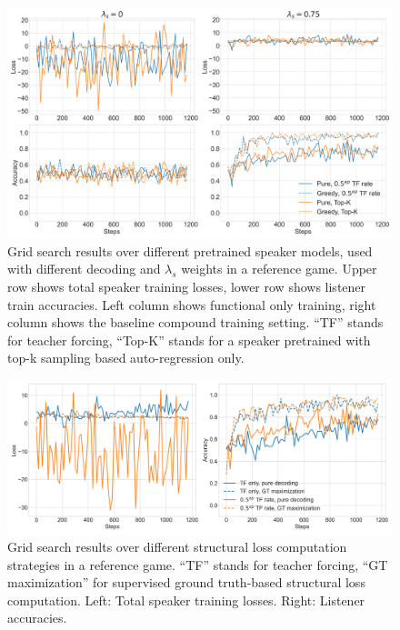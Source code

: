 \begin{figure}[h]
	\centering
	\includegraphics[width=\linewidth]{images/grid_search_pretraining_Ls_decoding.png}
	\caption{Grid search results over different pretrained speaker models, used with different decoding and $\lambda_s$ weights in a reference game. Upper row shows total speaker training losses, lower row shows listener train accuracies. Left column shows functional only training, right column shows the baseline compound training setting. ``TF'' stands for teacher forcing, ``Top-K'' stands for a speaker pretrained with top-k sampling based auto-regression only.}
	\label{fig:coco_grid_pretraining_decoding}
\end{figure}

\begin{figure}[h]
	\centering
	\includegraphics[width=\linewidth]{images/grid_search_Ls_calculation.png}
	\caption{Grid search results over different structural loss computation strategies in a reference game. ``TF'' stands for teacher forcing, ``GT maximization'' for supervised ground truth-based structural loss computation. Left: Total speaker training losses. Right: Listener accuracies.}
	\label{fig:coco_grid_Ls_calc}
\end{figure}

